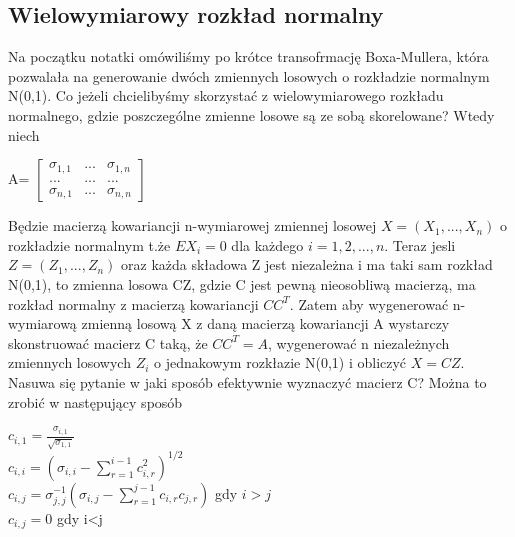 \documentclass[a4paper]{scrartcl}
\begin{document}
\subsection{Wielowymiarowy rozkład normalny}
Na początku notatki omówiliśmy po krótce transofrmację Boxa-Mullera, która pozwalała na generowanie dwóch zmiennych losowych o rozkładzie normalnym N(0,1). Co jeżeli chcielibyśmy skorzystać z wielowymiarowego rozkładu normalnego, gdzie poszczególne zmienne losowe są ze sobą skorelowane? Wtedy niech
\begin{center}
A=
$\begin{bmatrix}
\sigma_{1,1} & ... & \sigma_{1,n}\\
... & ... & ...\\
\sigma_{n,1} & ... & \sigma_{n,n}
\end{bmatrix}$
\end{center}
Będzie macierzą kowariancji n-wymiarowej zmiennej losowej $X=(X_1,...,X_n)$ o rozkładzie normalnym t.że $EX_i=0$ dla każdego $i=1,2,...,n$. Teraz jesli $Z=(Z_1,...,Z_n)$ oraz każda składowa Z jest niezależna i ma taki sam rozkład N(0,1), to zmienna losowa CZ, gdzie C jest pewną nieosobliwą macierzą, ma rozkład normalny z macierzą kowariancji $CC^T$. Zatem aby wygenerować n-wymiarową zmienną losową X z daną macierzą kowariancji A wystarczy skonstruować macierz C taką, że $CC^T=A$, wygenerować n niezależnych zmiennych losowych $Z_i$ o jednakowym rozkłazie N(0,1) i obliczyć $X=CZ$. Nasuwa się pytanie w jaki sposób efektywnie wyznaczyć macierz C? Można to zrobić w następujący sposób
\begin{center}
$c_{i,1}=\frac{\sigma_{i,1}}{\sqrt{\sigma_{1,1}}}$\\
$c_{i,i}=(\sigma_{i,i}-\sum_{r=1}^{i-1}c_{i,r}^2)^{1/2}$\\
$c_{i,j}=\sigma_{j,j}^{-1}(\sigma_{i,j}-\sum_{r=1}^{j-1}c_{i,r}c_{j,r})$ gdy $i>j$\\
$c_{i,j} = 0$ gdy i<j
\end{center}
\end{document}
